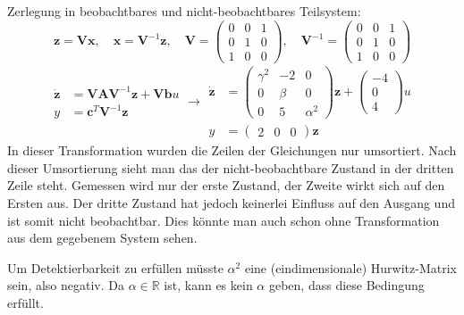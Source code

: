 \documentclass[crop=false]{standalone}
\begin{document}
\begin{task}
\begin{enumerate}[i]
\begin{solution}
 Zerlegung in beobachtbares und nicht-beobachtbares Teilsystem:
 \[ \mathbf{z} = \mathbf{V} \mathbf{x}, \quad \mathbf{x} = \mathbf{V}^{-1}\mathbf{z} , \quad \mathbf{V} = 
 \begin{pmatrix} 
 0 & 0 & 1\\
 0 & 1 & 0\\
 1 & 0 & 0
 \end{pmatrix},\quad
 \mathbf{V}^{-1} = 
 \begin{pmatrix} 
 0 & 0 & 1\\
 0 & 1 & 0\\
 1 & 0 & 0
 \end{pmatrix}\]
 \[
 \begin{aligned}
 \dot{\mathbf{z}} &= \mathbf{V} \mathbf{A} \mathbf{V}^{-1} \mathbf{z} + \mathbf{V} \mathbf{b} u\\
 y &= \mathbf{c}^T \mathbf{V}^{-1} \mathbf{z}
 \end{aligned} \rightarrow
  \begin{aligned}
 \dot{\mathbf{z}} &= 
 \begin{pmatrix}
 \gamma^2 & -2 & 0\\
 0 & \beta & 0\\
 0 & 5 & \alpha^2
 \end{pmatrix} 
 \mathbf{z} + 
 \begin{pmatrix}
 -4 \\ 0 \\ 4
 \end{pmatrix}
 u\\
 y &=  \begin{pmatrix}
 2 & 0 & 0
 \end{pmatrix} \mathbf{z}
 \end{aligned}
 \]
 In dieser Transformation wurden die Zeilen der Gleichungen nur umsortiert. Nach dieser Umsortierung sieht man das der nicht-beobachtbare Zustand in der dritten Zeile steht. Gemessen wird nur der erste Zustand, der Zweite wirkt sich auf den Ersten aus. Der dritte Zustand hat jedoch keinerlei Einfluss auf den Ausgang und ist somit nicht beobachtbar. Dies könnte man auch schon ohne Transformation aus dem gegebenem System sehen.
 
 Um Detektierbarkeit zu erfüllen müsste $\alpha^2$ eine (eindimensionale) Hurwitz-Matrix sein, also negativ. Da $\alpha \in \mathbb{R}$ ist, kann es kein $\alpha$ geben, dass diese Bedingung erfüllt.
 \end{solution}
 \end{enumerate}
\end{task}
\end{document}
